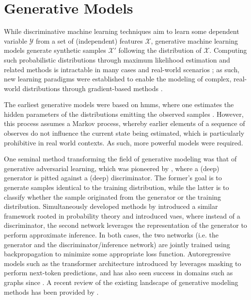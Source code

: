 \section{Generative Models}\label{genmodels}

While discriminative machine learning techniques aim to learn some dependent
variable $\mathcal{Y}$ from a set of (independent) features $\mathcal{X}$,
generative machine learning models generate synthetic samples $\mathcal{X}'$
following the distribution of $\mathcal{X}$. Computing such probabilistic
distributions through maximum likelihood estimation and related methods is
intractable in many cases \citep{rayner2002numerical,drovandi2011likelihood} and
real-world scenarios \citep{yildirim2015parameter}; as such, new
learning paradigms were established to enable the modeling of complex,
real-world distributions through gradient-based methods \citep{bond2021deep}.

The earliest generative models were based on \acrfull{hmms}, where one estimates
the hidden parameters of the distributions emitting the observed samples
\citep{baum1968growth, baum1970maximization}. However, this process assumes a
Markov process, whereby earlier elements of a sequence of observes do not
influence the current state being estimated, which is particularly prohibitive
in real world contexts. As such, more powerful models were required.

One seminal method transforming the field of generative modeling was that
of generative adversarial learning, which was pioneered by
\cite{goodfellow2014generative}, where a (deep) generator is pitted against a
(deep) discriminator. The former's goal is to generate samples identical to the
training distribution, while the latter is to classify whether the sample
originated from the generator or the training distribution. Simultaneously
developed methods by \cite{kingma2013auto} introduced a similar framework rooted
in probability theory and introduced \acrfull{vaes}, where instead
of a discriminator, the second network leverages the representation of the
generator to perform approximate inference. In both cases, the two networks
(i.e. the generator and the discriminator/inference network) are jointly trained
using backpropagation to minimize some appropriate loss function. Autoregressive
models such as the transformer architecture introduced by
\cite{vaswani2017attention} leverages masking to perform next-token predictions,
and has also seen success in domains such as graphs since
\citep{you2018graphrnn}. A recent review of the existing landscape of generative
modeling methods has been provided by \cite{bond2021deep}.

